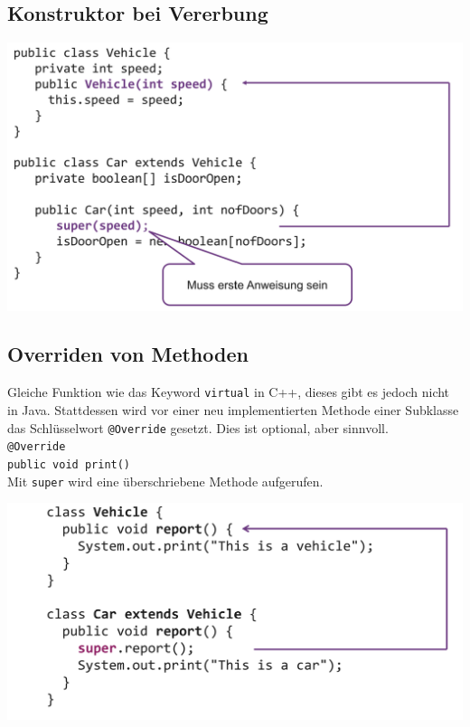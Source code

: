{\subsection{Konstruktor bei Vererbung}
    \begin{center}
        \includegraphics[width=0.7\columnwidth]{pictures/vererbung-konstr.png}
    \end{center}
    \vspace{-0.5cm}

\subsection{Overriden von Methoden}
    Gleiche Funktion wie das Keyword \verb|virtual| in C++, dieses gibt es jedoch nicht in Java. Stattdessen wird
    vor einer neu implementierten Methode einer Subklasse das Schlüsselwort \verb|@Override| gesetzt. Dies ist optional, aber sinnvoll.\\
    \verb|@Override|\\
    \verb|public void print()|\\

    Mit \verb|super| wird eine überschriebene Methode aufgerufen.
    \begin{center}
        \includegraphics[width=0.7\columnwidth]{pictures/super.png}
    \end{center}
    \vspace{-0.5cm}

}
